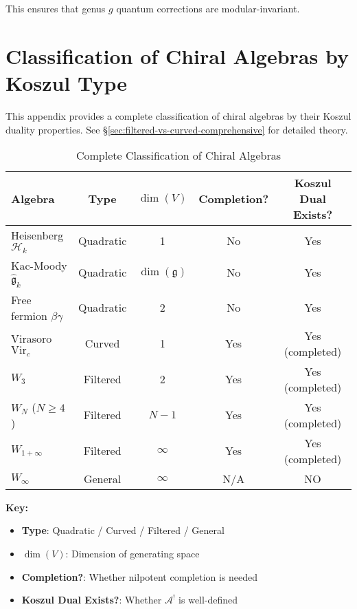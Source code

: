 This ensures that genus $g$ quantum corrections are modular-invariant.


\section{Classification of Chiral Algebras by Koszul Type}
\label{app:koszul-classification}

This appendix provides a complete classification of chiral algebras by their Koszul duality 
properties. See \S\ref{sec:filtered-vs-curved-comprehensive} for detailed theory.

\begin{table}[H]
\centering
\caption{Complete Classification of Chiral Algebras}
\begin{tabular}{|l|c|c|c|c|}
\hline
\textbf{Algebra} & \textbf{Type} & \textbf{$\dim(V)$} & \textbf{Completion?} & \textbf{Koszul Dual Exists?} \\
\hline
\hline
Heisenberg $\mathcal{H}_k$ & Quadratic & 1 & No & Yes \\
\hline
Kac-Moody $\widehat{\mathfrak{g}}_k$ & Quadratic & $\dim(\mathfrak{g})$ & No & Yes \\
\hline
Free fermion $\beta\gamma$ & Quadratic & 2 & No & Yes \\
\hline
Virasoro $\text{Vir}_c$ & Curved & 1 & Yes & Yes (completed) \\
\hline
$W_3$ & Filtered & 2 & Yes & Yes (completed) \\
\hline
$W_N$ ($N \geq 4$) & Filtered & $N-1$ & Yes & Yes (completed) \\
\hline
$W_{1+\infty}$ & Filtered & $\infty$ & Yes & Yes (completed) \\
\hline
$W_\infty$ & General & $\infty$ & N/A & NO \\
\hline
\end{tabular}
\end{table}

\textbf{Key:}
\begin{itemize}
\item \textbf{Type}: Quadratic / Curved / Filtered / General
\item \textbf{$\dim(V)$}: Dimension of generating space
\item \textbf{Completion?}: Whether nilpotent completion is needed
\item \textbf{Koszul Dual Exists?}: Whether $\mathcal{A}^!$ is well-defined
\end{itemize}

